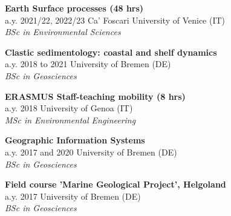 \documentclass[%
               doublesided,
               paper=a4,
               fontsize=10pt
              ]{my-resume}
\begin{document}
{    \smallskip
    
    \small{\textbf{Earth Surface processes (48 hrs)}\\
    \faCalendar\hspace{0.5em}a.y. 2021/22, 2022/23 \hspace{1em} \faUniversity\hspace{0.5em}Ca' Foscari University of Venice (IT)\\
    \faMortarBoard\hspace{0.5em}\textit{BSc in Environmental Sciences}}
    
        \smallskip

    \small{\textbf{Clastic sedimentology: coastal and shelf dynamics}\\
    \faCalendar\hspace{0.5em}a.y. 2018 to 2021 \hspace{1em} \faUniversity\hspace{0.5em}University of Bremen (DE)\\
    \faMortarBoard\hspace{0.5em}\textit{BSc in Geosciences}}
      
        \smallskip

    \small{\textbf{ERASMUS Staff-teaching mobility (8 hrs)}\\
    \faCalendar\hspace{0.5em}a.y. 2018 \hspace{1em} \faUniversity\hspace{0.5em}University of Genoa (IT)\\
    \faMortarBoard\hspace{0.5em}\textit{MSc in Environmental Engineering}}
 
        \smallskip

    \small{\textbf{Geographic Information Systems}\\
    \faCalendar\hspace{0.5em}a.y. 2017 and 2020 \hspace{1em} \faUniversity\hspace{0.5em}University of Bremen (DE)\\
    \faMortarBoard\hspace{0.5em}\textit{BSc in Geosciences}}

        \smallskip

    \small{\textbf{Field course 'Marine Geological Project', Helgoland}\\
    \faCalendar\hspace{0.5em}a.y. 2017 \hspace{1em} \faUniversity\hspace{0.5em}University of Bremen (DE)\\
    \faMortarBoard\hspace{0.5em}\textit{BSc in Geosciences}}

}
\end{document}
